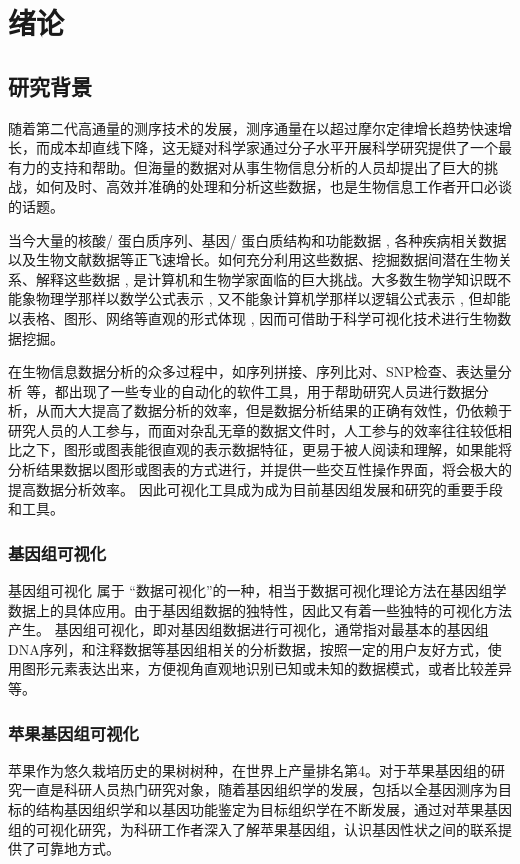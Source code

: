 \chapter{绪论}
	\section{研究背景}
	随着第二代高通量的测序技术的发展，测序通量在以超过摩尔定律增长趋势快速增长，而成本却直线下降，这无疑对科学家通过分子水平开展科学研究提供了一个最有力的支持和帮助。但海量的数据对从事生物信息分析的人员却提出了巨大的挑战，如何及时、高效并准确的处理和分析这些数据，也是生物信息工作者开口必谈的话题。
	
	 当今大量的核酸/ 蛋白质序列、基因/ 蛋白质结构和功能数据 , 各种疾病相关数据以及生物文献数据等正飞速增长。如何充分利用这些数据、挖掘数据间潜在生物关系、解释这些数据 , 是计算机和生物学家面临的巨大挑战。大多数生物学知识既不能象物理学那样以数学公式表示 , 又不能象计算机学那样以逻辑公式表示 , 但却能以表格、图形、网络等直观的形式体现 , 因而可借助于科学可视化技术进行生物数据挖掘。
	 
	 在生物信息数据分析的众多过程中，如序列拼接、序列比对、SNP检查、表达量分析 等，都出现了一些专业的自动化的软件工具，用于帮助研究人员进行数据分析，从而大大提高了数据分析的效率，但是数据分析结果的正确有效性，仍依赖于研究人员的人工参与，而面对杂乱无章的数据文件时，人工参与的效率往往较低相比之下，图形或图表能很直观的表示数据特征，更易于被人阅读和理解，如果能将分析结果数据以图形或图表的方式进行，并提供一些交互性操作界面，将会极大的提高数据分析效率。 因此可视化工具成为成为目前基因组发展和研究的重要手段和工具。
		\subsection{基因组可视化}
		基因组可视化 属于 “数据可视化”的一种，相当于数据可视化理论方法在基因组学数据上的具体应用。由于基因组数据的独特性，因此又有着一些独特的可视化方法产生。
		基因组可视化，即对基因组数据进行可视化，通常指对最基本的基因组DNA序列，和注释数据等基因组相关的分析数据，按照一定的用户友好方式，使用图形元素表达出来，方便视角直观地识别已知或未知的数据模式，或者比较差异等。
		\subsection{苹果基因组可视化}
		苹果作为悠久栽培历史的果树树种，在世界上产量排名第4。对于苹果基因组的研究一直是科研人员热门研究对象，随着基因组织学的发展，包括以全基因测序为目标的结构基因组织学和以基因功能鉴定为目标组织学在不断发展，通过对苹果基因组的可视化研究，为科研工作者深入了解苹果基因组，认识基因性状之间的联系提供了可靠地方式。
